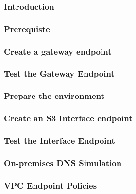 \subsubsection{Introduction}


\subsubsection{Prerequiste}




\subsubsection{Create a gateway endpoint}


\subsubsection{Test the Gateway Endpoint}




\subsubsection{Prepare the environment}


\subsubsection{Create an S3 Interface endpoint}


\subsubsection{Test the Interface Endpoint}


\subsubsection{On-premises DNS Simulation}


\subsubsection{VPC Endpoint Policies}


